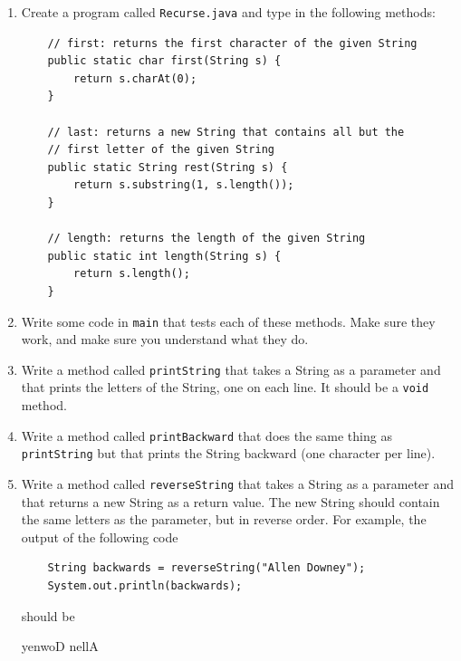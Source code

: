 \begin{exercise}
\begin{enumerate}

\item Create a program called {\tt Recurse.java} and
type in the following methods:

\begin{lstlisting}
    // first: returns the first character of the given String
    public static char first(String s) {
        return s.charAt(0);
    }

    // last: returns a new String that contains all but the
    // first letter of the given String
    public static String rest(String s) {
        return s.substring(1, s.length());
    }

    // length: returns the length of the given String
    public static int length(String s) {
        return s.length();
    }
\end{lstlisting}

\item Write some code in {\tt main} that tests each of these
methods.  Make sure they work, and make sure you understand
what they do.

\item Write a method called {\tt printString} that takes a
String as a parameter and that prints the letters of the
String, one on each line.  It should be a {\tt void} method.

\item Write a method called {\tt printBackward} that does
the same thing as {\tt printString} but that prints the String
backward (one character per line).

\item Write a method called {\tt reverseString} that takes
a String as a parameter and that returns a new String as a
return value.  The new String should contain the same letters
as the parameter, but in reverse order.  For example, the
output of the following code

\begin{lstlisting}
    String backwards = reverseString("Allen Downey");
    System.out.println(backwards);
\end{lstlisting}
%
should be

\begin{verbatimtab}
yenwoD nellA
\end{verbatimtab}

\end{enumerate}
\end{exercise}



